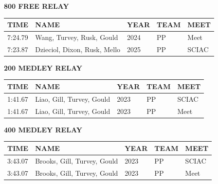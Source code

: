 \begin{table}[H]
\centering
\begin{minipage}[t]{0.6\textwidth}
\centering
\textbf{800 FREE RELAY}\\[0.1cm]
\begin{tabular}{@{}p{1.8cm}p{2.8cm}p{1.2cm}p{1.4cm}p{1.4cm}@{}}
\hline
    \textbf{TIME} & \textbf{NAME} & \textbf{YEAR} & \textbf{TEAM} & \textbf{MEET} \\
\hline
    7:24.79 & Wang, Turvey, Rusk, Gould & 2024 & PP & Meet \\
    7:23.87 & Dzieciol, Dixon, Rusk, Mello & 2025 & PP & SCIAC \\
\hline
\end{tabular}
\end{minipage}
\end{table}

\begin{table}[H]
\centering
\begin{minipage}[t]{0.6\textwidth}
\centering
\textbf{200 MEDLEY RELAY}\\[0.1cm]
\begin{tabular}{@{}p{1.8cm}p{2.8cm}p{1.2cm}p{1.4cm}p{1.4cm}@{}}
\hline
    \textbf{TIME} & \textbf{NAME} & \textbf{YEAR} & \textbf{TEAM} & \textbf{MEET} \\
\hline
    1:41.67 & Liao, Gill, Turvey, Gould & 2023 & PP & SCIAC \\
    1:41.67 & Liao, Gill, Turvey, Gould & 2023 & PP & Meet \\
\hline
\end{tabular}
\end{minipage}
\end{table}

\begin{table}[H]
\centering
\begin{minipage}[t]{0.6\textwidth}
\centering
\textbf{400 MEDLEY RELAY}\\[0.1cm]
\begin{tabular}{@{}p{1.8cm}p{2.8cm}p{1.2cm}p{1.4cm}p{1.4cm}@{}}
\hline
    \textbf{TIME} & \textbf{NAME} & \textbf{YEAR} & \textbf{TEAM} & \textbf{MEET} \\
\hline
    3:43.07 & Brooks, Gill, Turvey, Gould & 2023 & PP & SCIAC \\
    3:43.07 & Brooks, Gill, Turvey, Gould & 2023 & PP & Meet \\
\hline
\end{tabular}
\end{minipage}
\end{table}

